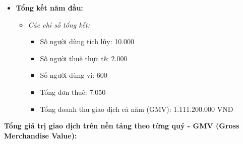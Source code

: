\begin{itemize}
\begin{itemize}
\begin{itemize}
            \item Tổng giá trị giao dịch trên nền tảng: 675.000.000 VNĐ
            \item Tổng giao dịch nhờ mở ví: 18.000.000 VNĐ
            \item Tổng giao dịch quý (GMV): 693.000.000 VNĐ
        \end{itemize}
    \end{itemize}
    \item \textbf{Tổng kết năm đầu:}
    \begin{itemize}
        \item \textit{Các chỉ số tổng kết:}
        \begin{itemize}
            \item Số người dùng tích lũy: 10.000
            \item Số người thuê thực tế: 2.000
            \item Số người dùng ví: 600
            \item Tổng đơn thuê: 7.050
            \item Tổng doanh thu giao dịch cả năm (GMV): 1.111.200.000 VNĐ
        \end{itemize}
    \end{itemize}
\end{itemize}
 
\textbf{Tổng giá trị giao dịch trên nền tảng theo từng quý - GMV (Gross Merchandise Value):}

\begin{table}[htbp]
    \centering
    \caption{Tổng giá trị giao dịch theo từng quý (GMV)}
\end{table}

